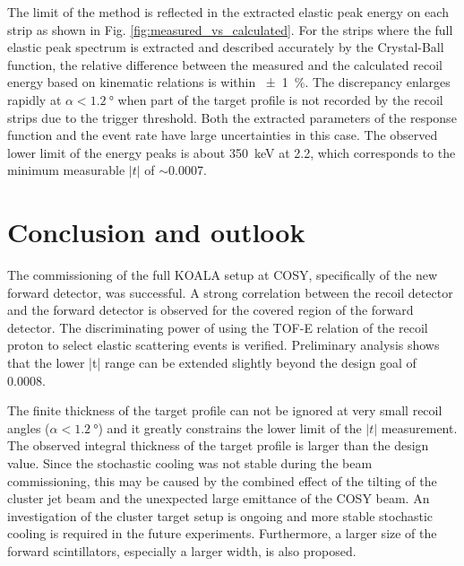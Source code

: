 \documentclass[number,5p]{elsarticle}
\begin{document}
The limit of the method is reflected in the extracted elastic peak energy on each strip as shown in
Fig. \ref{fig:measured_vs_calculated}.
For the strips where the full elastic peak spectrum is extracted and described accurately
by the Crystal-Ball function, the relative difference between the measured and
the calculated recoil energy based on kinematic relations is within \SI{\pm 1}{\percent}.
The discrepancy enlarges rapidly at $\alpha < \SI{1.2}{\degree}$ when part of
the target profile is not recorded by the recoil strips due to the trigger threshold.
Both the extracted parameters of the response function and the event rate have large uncertainties in this case.
The observed lower limit of the energy peaks is about \SI{350}{\keV} at \SI{2.2}{\momentum}, which corresponds to the minimum measurable $|t|$ of $\sim$\SI{0.0007}{\tmom}.

\section{Conclusion and outlook}
\label{sec:conclusion}

The commissioning of the full KOALA setup at COSY, specifically of the new forward detector, was successful.
A strong correlation between the recoil detector and the forward detector is
observed for the covered region of the forward detector.
The discriminating power of using the TOF-E relation of the recoil proton to select elastic
scattering events is verified.
Preliminary analysis shows that the lower |t| range can be extended slightly beyond the design goal of \SI{0.0008}{\tmom}.

The finite thickness of the target profile can not be ignored at
very small recoil angles ($\alpha < \SI{1.2}{\degree}$) and it greatly
constrains the lower limit of the $|t|$ measurement.
The observed integral thickness of the target profile is larger than the design value.
Since the stochastic cooling was not stable during the beam commissioning, this may be caused by the combined effect of the tilting of the cluster jet
beam and the unexpected large emittance of the COSY beam.
An investigation of the cluster target setup is ongoing and more stable stochastic cooling is required in the future experiments.
Furthermore, a larger size of the forward scintillators, especially a larger width, is also proposed.
\end{document}
